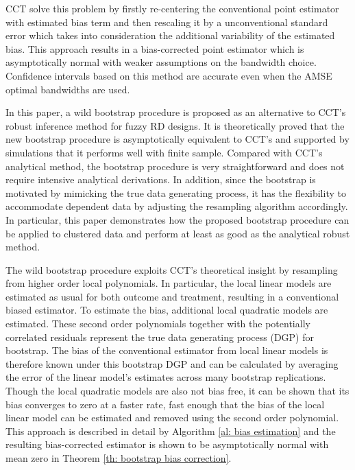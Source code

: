 \documentclass[12pt,]{article}
\DeclareMathOperator{\1}{\mathbbm{1}}
\begin{document}
CCT solve this problem by firstly re-centering the conventional point estimator with estimated bias term and then rescaling it by a unconventional standard error which takes into consideration the additional variability of the estimated bias. This approach results in a bias-corrected point estimator which is asymptotically normal with weaker assumptions on the bandwidth choice. Confidence intervals based on this method are accurate even when the AMSE optimal bandwidths are used.

In this paper, a wild bootstrap procedure is proposed as an alternative to CCT's robust inference method for fuzzy RD designs. It is theoretically proved that the new bootstrap procedure is asymptotically equivalent to CCT's and supported by simulations that it performs well with finite sample. Compared with CCT's analytical method, the bootstrap procedure is very straightforward and does not require intensive analytical derivations. In addition, since the bootstrap is motivated by mimicking the true data generating process, it has the flexibility to accommodate dependent data by adjusting the resampling algorithm accordingly. In particular, this paper demonstrates how the proposed bootstrap procedure can be applied to clustered data and perform at least as good as the analytical robust method.

The wild bootstrap procedure exploits CCT's theoretical insight by resampling from higher order local polynomials. In particular, the local linear models are estimated as usual for both outcome and treatment, resulting in a conventional biased estimator. To estimate the bias, additional local quadratic models are estimated. These second order polynomials together with the potentially correlated residuals represent the true data generating process (DGP) for bootstrap. The bias of the conventional estimator from local linear models is therefore known under this bootstrap DGP and can be calculated by averaging the error of the linear model's estimates across many bootstrap replications. Though the local quadratic models are also not bias free, it can be shown that its bias converges to zero at a faster rate, fast enough that the bias of the local linear model can be estimated and removed using the second order polynomial. This approach is described in detail by Algorithm \ref{al: bias estimation} and the resulting bias-corrected estimator is shown to be asymptotically normal with mean zero in  Theorem \ref{th: bootstrap bias correction}.
\end{document}

